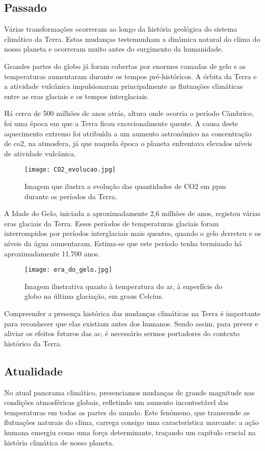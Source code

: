 \documentclass{report}
\begin{document}
\subsection{Passado}

Várias transformações ocorreram ao longo da história geológica do sistema climático da Terra. Estas mudanças testemunham a dinâmica natural do clima do nosso planeta e ocorreram muito antes do surgimento da humanidade.

Grandes partes do globo já foram cobertas por enormes camadas de gelo e as temperaturas aumentaram durante os tempos pré-históricos. A órbita da Terra e a atividade vulcânica impulsionaram principalmente as flutuações climáticas entre as eras glaciais e os tempos interglaciais.

Há cerca de 500 milhões de anos atrás, altura onde ocorria o período Câmbrico, foi uma época em que a Terra ficou excecionalmente quente. A causa deste aquecimento extremo foi atribuída a um aumento astronómico na concentração de \ac{co2}, na atmosfera, já que naquela época o planeta enfrentava elevados níveis de atividade vulcânica.

\begin{figure}[H]
	\centering
	\texttt{[image: CO2\_evolucao.jpg]}
	\caption{Imagem que ilustra a evolução das quantidades de CO2 em ppm durante os períodos da Terra.}
	\label{fig:co2-evolucao}
\end{figure}

A Idade do Gelo, iniciada a aproximadamente 2,6 milhões de anos, registou várias eras glaciais da Terra. Esses períodos de temperaturas glaciais foram interrompidos por períodos interglaciais mais quentes, quando o gelo derreteu e os níveis da água aumentaram. Estima-se que este período tenha terminado há aproximadamente 11.700 anos.

\begin{figure}[H]
	\centering
	\texttt{[image: era\_do\_gelo.jpg]}
	\caption{Imagem ilustrativa quanto à temperatura do ar, à superfície do globo na última glaciação, em graus Celcius.}
	\label{fig:era-do-gelo}
\end{figure}

Compreender a presença histórica das mudanças climáticas na Terra é importante para reconhecer que elas existiam antes dos humanos. Sendo assim, para prever e aliviar os efeitos futuros das \ac{ac}, é necessário sermos portadores do contexto histórico da Terra.

\subsection{Atualidade}
No atual panorama climático, presenciamos mudanças de grande magnitude nas condições atmosféricas globais, refletindo um aumento incontestável das temperaturas em todas as partes do mundo. Este fenómeno, que transcende as flutuações naturais do clima, carrega consigo uma característica marcante: a ação humana emergiu como uma força determinante, traçando um capítulo crucial na história climática de nosso planeta.
\end{document}
